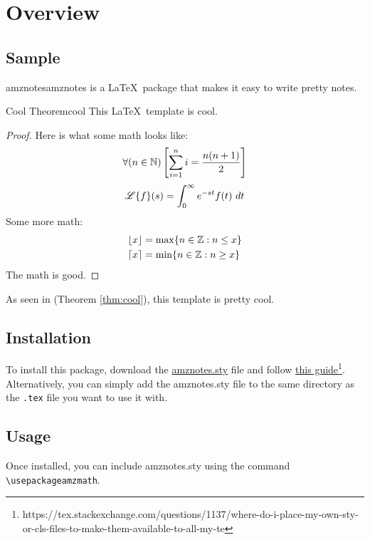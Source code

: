 \documentclass[12pt]{report}
\begin{document}
    \tableofcontents

    \chapter{Overview}
    \section{Sample}
    \begin{dfnbox}{amznotes}{amznotes}
         is a \LaTeX\ package that makes it easy to write pretty notes.
    \end{dfnbox}

    \begin{thmbox}{Cool Theorem}{cool}
        This \LaTeX\ template is cool.
        \tcblower
        \begin{proof}
            Here is what some math looks like:
            \[ \forall (n \in \mathbb{N}) \left[ \sum_{i=1}^n i = \frac{n(n+1)}{2} \right] \]
            \[ \operatorname{\mathscr{L}} \{ f \} (s) = \int_{0}^{\infty} e^{-st} f(t)\ dt \]
            Some more math:
            \begin{align*}
                \lfloor x\rfloor &= \max \{ n \in \mathbb{Z} : n \leq x \} \\
                \lceil x\rceil &= \min \{ n \in \mathbb{Z} : n \geq x \}
            \end{align*}
            The math is good.
        \end{proof}
    \end{thmbox}

    As seen in  (Theorem \ref{thm:cool}), this template is pretty cool.

    \section{Installation}
    To install this package, download the \href{https://raw.githubusercontent.com/alexmingzhang/latex-notes-template/main/amznotes.sty}{amznotes.sty} file and follow \href{https://tex.stackexchange.com/questions/1137/where-do-i-place-my-own-sty-or-cls-files-to-make-them-available-to-all-my-te}{this guide}\footnote{https://tex.stackexchange.com/questions/1137/where-do-i-place-my-own-sty-or-cls-files-to-make-them-available-to-all-my-te}. Alternatively, you can simply add the amznotes.sty file to the same directory as the \texttt{.tex} file you want to use it with.

    \section{Usage}
    Once installed, you can include amznotes.sty using the command  \texttt{\textbackslash usepackage\textbraceleft amzmath\textbraceright}.
\end{document}

